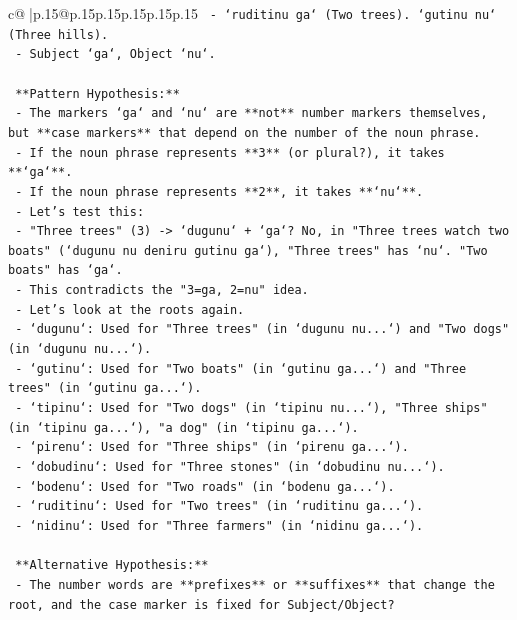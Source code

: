 \documentclass{article}
\begin{document}
{\begin{supertabular}{c@{$\;$}|p{.15\linewidth}@{}p{.15\linewidth}p{.15\linewidth}p{.15\linewidth}p{.15\linewidth}p{.15\linewidth}}
{{{\texttt{                 {-} `ruditinu ga` (Two trees). `gutinu nu` (Three hills).} \\
\texttt{                 {-} Subject `ga`, Object `nu`.} \\
\\ 
\texttt{   **Pattern Hypothesis:**} \\
\texttt{   {-} The markers `ga` and `nu` are **not** number markers themselves, but **case markers** that depend on the number of the noun phrase.} \\
\texttt{   {-} If the noun phrase represents **3** (or plural?), it takes **`ga`**.} \\
\texttt{   {-} If the noun phrase represents **2**, it takes **`nu`**.} \\
\texttt{   {-} Let's test this:} \\
\texttt{     {-} "Three trees" (3) {-}> `dugunu` + `ga`? No, in "Three trees watch two boats" (`dugunu nu deniru gutinu ga`), "Three trees" has `nu`. "Two boats" has `ga`.} \\
\texttt{     {-} This contradicts the "3=ga, 2=nu" idea.} \\
\texttt{     {-} Let's look at the roots again.} \\
\texttt{       {-} `dugunu`: Used for "Three trees" (in `dugunu nu...`) and "Two dogs" (in `dugunu nu...`).} \\
\texttt{       {-} `gutinu`: Used for "Two boats" (in `gutinu ga...`) and "Three trees" (in `gutinu ga...`).} \\
\texttt{       {-} `tipinu`: Used for "Two dogs" (in `tipinu nu...`), "Three ships" (in `tipinu ga...`), "a dog" (in `tipinu ga...`).} \\
\texttt{       {-} `pirenu`: Used for "Three ships" (in `pirenu ga...`).} \\
\texttt{       {-} `dobudinu`: Used for "Three stones" (in `dobudinu nu...`).} \\
\texttt{       {-} `bodenu`: Used for "Two roads" (in `bodenu ga...`).} \\
\texttt{       {-} `ruditinu`: Used for "Two trees" (in `ruditinu ga...`).} \\
\texttt{       {-} `nidinu`: Used for "Three farmers" (in `nidinu ga...`).} \\
\\ 
\texttt{   **Alternative Hypothesis:**} \\
\texttt{   {-} The number words are **prefixes** or **suffixes** that change the root, and the case marker is fixed for Subject/Object?} \\
}}}
\end{supertabular}}
\end{document}
